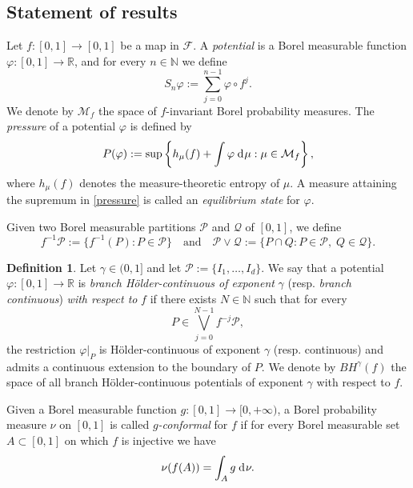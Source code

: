 \documentclass[12pt]{amsart}
\numberwithin{equation}{section} %
\numberwithin{figure}{section} %
\theoremstyle{plain}
\theoremstyle{definition}
\newtheorem{defi}[prop]{Definition}
\theoremstyle{remark}
\theoremstyle{citing}
\newcommand{\N}{\mathbb{N}}
\newcommand{\R}{\mathbb{R}}
\newcommand{\sF}{\mathscr{F}}
\renewcommand{\=}{\coloneqq}
\newcommand{\dd}{\hspace{1pt}\operatorname{d}\hspace{-1pt}}
\begin{document}
\subsection{Statement of results}

Let $f:[0,1]\to[0,1]$ be a map in $\sF$. A \emph{potential} is a Borel measurable function $\varphi\colon [0,1]\to\R$, and for every $n\in \N$ we define
\begin{equation*}
    S_n\varphi := \sum_{j=0}^{n-1} \varphi\circ f^j.
\end{equation*}
We denote by $\mathcal{M}_f$ the space of $f$-invariant Borel probability measures. The \emph{pressure} of a potential $\varphi$ is defined by
\begin{equation}\label{pressure}
    P(\varphi) := \sup\left\{h_{\mu}(f) + \int \varphi\dd\mu : \mu\in \mathcal{M}_f\right\},
\end{equation}
where $h_{\mu}(f)$ denotes the measure-theoretic entropy of $\mu$. A measure attaining the supremum in \eqref{pressure} is called an \emph{equilibrium state} for $\varphi$.

Given two Borel measurable partitions $\mathcal{P}$ and $\mathcal{Q}$ of $[0,1]$, we define
\begin{equation*}
    f^{-1}\mathcal{P} := \{f^{-1}(P): P \in \mathcal{P}\}
    \quad \text{and} \quad
    \mathcal{P}\vee \mathcal{Q} := \{P\cap Q : P\in \mathcal{P},\; Q\in\mathcal{Q}\}.
\end{equation*}

\begin{defi}\label{branch Holder}
Let $\gamma\in (0,1]$ and let $\mathcal{P}:=\{I_1,\ldots,I_d\}$. We say that a potential $\varphi\colon [0,1]\to\R$ is \emph{branch Hölder-continuous of exponent} $\gamma$ (resp. \emph{branch continuous}) \emph{with respect to} $f$ if there exists $N\in \N$ such that for every
\begin{equation*}
P\in \bigvee_{j=0}^{N-1}f^{-j}\mathcal{P},
\end{equation*}
the restriction $\varphi|_P$ is Hölder-continuous of exponent $\gamma$ (resp. continuous) and admits a continuous extension to the boundary of $P$. We denote by $BH^{\gamma}(f)$ the space of all branch Hölder-continuous potentials of exponent $\gamma$ with respect to $f$.
\end{defi}

Given a Borel measurable function $g\colon [0,1]\to [0,+\infty)$, a Borel probability measure $\nu$ on $[0,1]$ is called \emph{$g$-conformal} for $f$ if for every Borel measurable set $A\subset [0,1]$ on which $f$ is injective we have
\begin{equation*}
    \nu(f(A)) = \int_A g \dd\nu.
\end{equation*}
\end{document}
